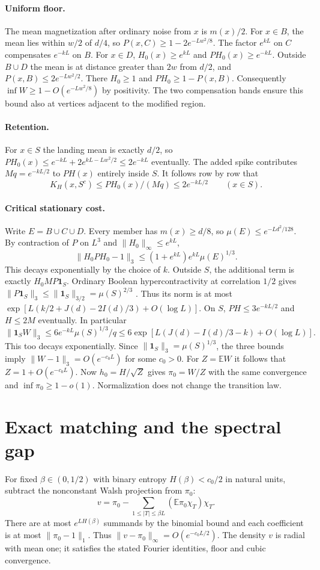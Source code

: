 \documentclass[11pt]{article}
\newcommand{\E}{\mathbb E}
\newcommand{\one}{\mathbf 1}
\begin{document}
\paragraph{Uniform floor.}
The mean magnetization after ordinary noise from $x$ is $m(x)/2$. For $x\in B$, the mean lies within $w/2$ of $d/4$, so $P(x,C)\ge1-2e^{-Lw^2/8}$. The factor $e^{kL}$ on $C$ compensates $e^{-kL}$ on $B$. For $x\in D$, $H_0(x)\ge e^{kL}$ and $PH_0(x)\ge e^{-kL}$. Outside $B\cup D$ the mean is at distance greater than $2w$ from $d/2$, and $P(x,B)\le2e^{-Lw^2/2}$. There $H_0\ge1$ and $PH_0\ge1-P(x,B)$. Consequently $\inf W\ge1-O(e^{-Lw^2/8})$ by positivity. The two compensation bands ensure this bound also at vertices adjacent to the modified region.

\paragraph{Retention.}
For $x\in S$ the landing mean is exactly $d/2$, so
$PH_0(x)\le e^{-kL}+2 e^{kL-Lw^2/2}\le2e^{-kL}$ eventually.
The added spike contributes $Mq=e^{-kL/2}$ to $PH(x)$ entirely inside $S$. It follows row by row that
\[
 K_H(x,S^c)\le PH_0(x)/(Mq)\le2e^{-kL/2}\qquad(x\in S).
\]

\paragraph{Critical stationary cost.}
Write $E=B\cup C\cup D$. Every member has $m(x)\ge d/8$, so $\mu(E)\le e^{-Ld^2/128}$. By contraction of $P$ on $L^3$ and $\|H_0\|_\infty\le e^{kL}$,
\[
 \|H_0PH_0-1\|_3\le (1+e^{kL})e^{kL}\mu(E)^{1/3}.
\]
This decays exponentially by the choice of $k$. Outside $S$, the additional term is exactly $H_0 M P\one_S$. Ordinary Boolean hypercontractivity at correlation $1/2$ gives $\|P\one_S\|_3\le\|\one_S\|_{3/2}=\mu(S)^{2/3}$ \cite{bonami}. Thus its norm is at most $\exp[L(k/2+J(d)-2I(d)/3)+O(\log L)]$. On $S$, $PH\le3e^{-kL/2}$ and $H\le 2M$ eventually. In particular
\[
 \|\one_S W\|_3\le6 e^{-kL}\mu(S)^{1/3}/q
 \le 6\exp[L(J(d)-I(d)/3-k)+O(\log L)] .
\]
This too decays exponentially. Since $\|\one_S\|_3=\mu(S)^{1/3}$, the three bounds imply $\|W-1\|_3=O(e^{-c_0L})$ for some $c_0>0$. For $Z=\E W$ it follows that $Z=1+O(e^{-c_0L})$. Now $h_0=H/\sqrt Z$ gives $\pi_0=W/Z$ with the same convergence and $\inf\pi_0\ge1-o(1)$. Normalization does not change the transition law.

\section{Exact matching and the spectral gap}
For fixed $\beta\in(0,1/2)$ with binary entropy $H(\beta)<c_0/2$ in natural units, subtract the nonconstant Walsh projection from $\pi_0$:
\[
 v=\pi_0-\sum_{1\le|T|\le\beta L}(\E\pi_0\chi_T)\chi_T.
\]
There are at most $e^{LH(\beta)}$ summands by the binomial bound and each coefficient is at most $\|\pi_0-1\|_1$. Thus $\|v-\pi_0\|_\infty=O(e^{-c_0L/2})$. The density $v$ is radial with mean one; it satisfies the stated Fourier identities, floor and cubic convergence.
\end{document}
